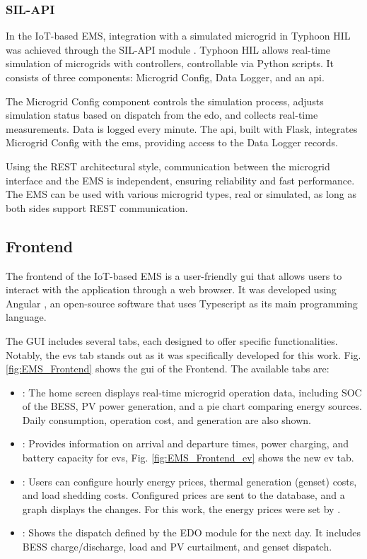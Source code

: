 \documentclass[preprint, 10pt, 5p]{elsarticle}
\begin{document}
\subsubsection{SIL-API}

In the IoT-based EMS, integration with a simulated microgrid in 
Typhoon HIL \cite{typhoonhil_software} was achieved through the SIL-API 
module \cite{typhoonhil_api}. Typhoon HIL allows real-time simulation 
of microgrids with controllers, controllable via Python scripts.
It consists of three components: Microgrid Config, Data Logger, and an 
\gls{api}.

The Microgrid Config component controls the simulation process, adjusts 
simulation status based on dispatch from the \gls{edo}, and collects real-time 
measurements. Data is logged every minute. The \gls{api}, built with Flask, 
integrates Microgrid Config with the \gls{ems}, providing access to the 
Data Logger records.

Using the REST architectural style, communication between the microgrid 
interface and the EMS is independent, ensuring reliability and fast performance. 
The EMS can be used with various microgrid types, real or simulated, 
as long as both sides support REST communication.

\subsection{Frontend}

The frontend of the IoT-based EMS is a user-friendly \gls{gui} that allows 
users to interact with the application through a web browser. 
It was developed using Angular \cite{angular}, an open-source software that 
uses Typescript as its main programming language.

The GUI includes several tabs, each designed to offer specific functionalities. 
Notably, the \glspl{ev} tab stands out as it was specifically 
developed for this work. Fig. \ref{fig:EMS_Frontend} shows the \gls{gui} of 
the Frontend. The available tabs are:

\begin{itemize}
    \item {}: The home screen displays real-time microgrid 
    operation data, including SOC of the BESS, PV power generation, and a pie 
    chart comparing energy sources. Daily consumption, operation cost, and 
    generation are also shown.
    \item {}: Provides information on 
    arrival and departure times, power charging, and battery capacity for 
    \glspl{ev}, Fig. \ref{fig:EMS_Frontend_ev} shows the new \gls{ev} tab.
    \item {}: Users can configure hourly energy prices, 
    thermal generation (genset) costs, and load shedding costs. 
    Configured prices are sent to the database, and a graph displays the 
    changes. For this work, the energy prices were set by \cite{aneel}.
    \item {}: Shows the dispatch defined by the EDO 
    module for the next day. It includes BESS charge/discharge, load and PV 
    curtailment, and genset dispatch.
\end{itemize}
\end{document}
